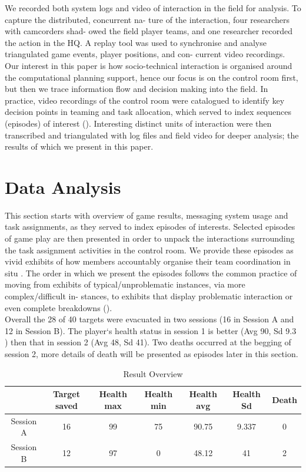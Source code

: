We recorded both system logs and video of interaction in the field for analysis. To capture the distributed, concurrent na- ture of the interaction, four researchers with camcorders shad- owed the field player teams, and one researcher recorded the action in the HQ. A replay tool was used to synchronise and analyse triangulated game events, player positions, and con- current video recordings.\\

Our interest in this paper is how socio-technical interaction is organised around the computational planning support, hence our focus is on the control room first, but then we trace information flow and decision making into the field. In practice, video recordings of the control room were catalogued to identify key decision points in teaming and task allocation, which served to index sequences (episodes) of interest (\cite{Heath2010}). Interesting distinct units of interaction were then transcribed and triangulated with log files and field video for deeper analysis; the results of which we present in this paper.\\


\section{Data Analysis}
This section starts with overview of game results, messaging system usage and task assignments, as they served to index episodes of interests. Selected episodes of game play are then presented in order to unpack the interactions surrounding the task assignment activities in the control room. We provide these episodes as vivid exhibits of how members accountably organise their team coordination in situ \cite{Crabtree2012}. The order in which we present the episodes follows the common practice of moving from exhibits of typical/unproblematic instances, via more complex/difficult in- stances, to exhibits that display problematic interaction or even complete breakdowns (\cite{Heath2010}).\\

Overall the 28 of 40 targets were evacuated in two sessions (16 in Session A and 12 in Session B). The player`s health status in session 1 is better  (Avg 90, Sd 9.3 ) then that in session 2 (Avg 48, Sd 41). Two deaths occurred at the begging of session 2, more details of death will be presented as episodes later in this section. \\

\begin{table}[h]
\centering
\footnotesize
\label{my-label}
\begin{tabular}{c|cccccc}
          & Target saved & Health max & Health min & Health avg & Health Sd & Death \\ \hline
Session A & 16           & 99         & 75         & 90.75      & 9.337     & 0     \\
Session B & 12           & 97         & 0          & 48.12      & 41        & 2    
\end{tabular}
\caption{Result Overview}
\label{tab:ResultsOverview}
\end{table}


